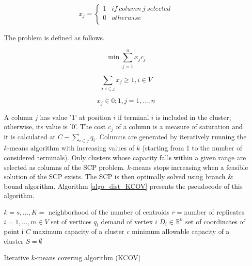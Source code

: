 \begin{equation}
   \begin{split}
   x_{j}=\left\{
                \begin{array}{ll}
                  1 & if\ column\ j\ selected \\
                  0 & otherwise\\
                \end{array}
              \right.
   \end{split}
\end{equation}

The problem is defined as follows.

\begin{equation}
    \min{\sum_{j=1}^{n}{x_jc_j}}
\end{equation}

\begin{equation}
    \sum_{j:i\in j}{x_j\geq1} , i\in V
\end{equation}

\begin{equation}
    x_j\in{0;1} , j=1,\ldots,n
\end{equation}

A column $j$ has value '1' at position $i$ if terminal $i$ is included in the cluster; otherwise, its value is '0'. The cost $c_j$ of a column is a measure of saturation and it is calculated at $C-\sum_{i\in j} q_i$. Columns are generated by iteratively running the $k$-means algorithm with increasing values of $k$ (starting from 1 to the number of considered terminals). Only clusters whose capacity falls within a given range are selected as columns of the SCP problem. $k$-means stops increasing when a feasible solution of the SCP exists. The SCP is then optimally solved using branch \& bound algorithm. Algorithm \ref{algo_dist_KCOV} presents the pseudocode of this algorithm.

\begin{algorithm}[H]
\DontPrintSemicolon
\SetAlgoLined
$k=s,...,K =$ neighborhood of the number of centroids \;
$r=$number of replicates\;
$i=1,...,m \in V$ set of vertices \;
$q_i$ demand of vertex $i$ \;
$D_i \in \mathbb{R}^n $ set of coordinates of point i \;
$C$ maximum capacity of a cluster \;
$c$ minimum allowable capacity of a cluster \;
$S= \emptyset $ \;

    
\caption{Iterative $k$-means covering algorithm (KCOV)}
\label{algo_dist_KCOV}    
\end{algorithm}

